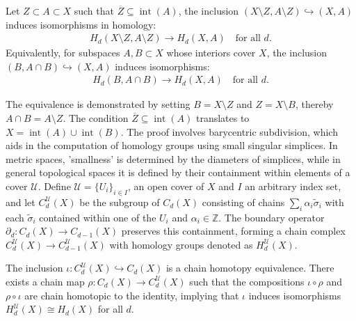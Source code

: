 \begin{theorem}
	{\cite[Theorem 2.20]{hatcher2005algebraic}
	\label{excisiontheorem}
	Let $Z \subset A \subset X$ such that $\overline{Z}\subseteq \operatorname{int}(A)$, the inclusion $(X\setminus Z, A\setminus Z) \hookrightarrow (X, A)$ induces isomorphisms in homology}:
	\begin{align}
		H_{d}(X\setminus Z, A\setminus Z) \to H_{d}(X, A) \quad \text{for all }d. 
	\end{align}
	Equivalently, for subspaces $A, B \subset X$ whose interiors cover $X$, the
	inclusion $(B, A \cap B) \hookrightarrow (X, A)$ induces isomorphisms:
	\begin{align}
		H_{d}(B, A \cap B) \to H_{d}(X, A) \quad \text{for all }d. 
	\end{align}
\end{theorem}

The equivalence is demonstrated by setting \( B = X \setminus Z \) and \( Z = X \setminus B \), thereby \( A \cap B = A \setminus Z \). The condition \( \overline{Z} \subseteq \operatorname{int}(A) \) translates to \( X = \operatorname{int}(A) \cup \operatorname{int}(B) \). The proof involves barycentric subdivision, which aids in the computation of homology groups using small singular simplices. In metric spaces, 'smallness' is determined by the diameters of simplices, while in general topological spaces it is defined by their containment within elements of a cover \( \mathcal{U} \). Define \( \mathcal{U} = \{U_{i}\}_{i \in I} \), an open cover of \( X \) and $I$ an arbitrary index set, and let \( C^{\mathcal{U}}_{d}(X) \) be the subgroup of \( C_{d}(X) \) consisting of chains \( \sum_{i} \alpha_{i} \tilde{\sigma}_{i} \) with each \( \tilde{\sigma}_{i} \) contained within one of the \( U_{i} \) and $\alpha_i \in \mathbb{Z}$. The boundary operator \( \partial_d: C_{d}(X) \to C_{d-1}(X) \) preserves this containment, forming a chain complex \( C^{\mathcal{U}}_{d}(X) \to C^{\mathcal{U}}_{d-1}(X) \) with homology groups denoted as \( H^{\mathcal{U}}_{d}(X) \).

\begin{proposition}{\cite[Proposition 2.21]{hatcher2005algebraic}}
	\label{baryproof}
	The inclusion \( \iota : C^{\mathcal{U}}_d(X) \hookrightarrow C_d(X) \) is a chain homotopy equivalence. There exists a chain map \( \rho : C_d(X) \to C^{\mathcal{U}}_d(X) \) such that the compositions \( \iota \circ \rho \) and \( \rho \circ \iota \) are chain homotopic to the identity, implying that \( \iota \) induces isomorphisms \( H^{\mathcal{U}}_d(X) \cong H_d(X) \) for all \( d \).
\end{proposition}

